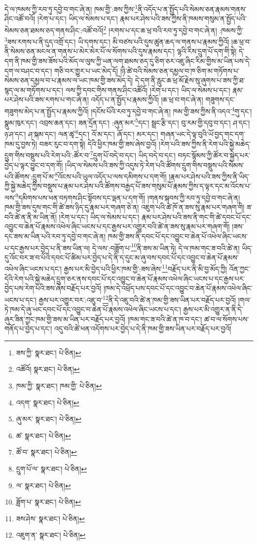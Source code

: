 དེ་ལ་ཁམས་ཀྱི་རབ་ཏུ་དབྱེ་བ་གང་ཞེ་ན། ཁམ་གྱི་:ཟས་ཀྱིས་\footnote{ཟས་ཀྱི་  སྣར་ཐང་།  པེ་ཅིན། }ནི་འདོད་པ་ན་སྤྱོད་པའི་སེམས་ཅན་རྣམས་གནས་ཤིང་འཚོ་བའོ། །རེག་པ་དང་། ཡིད་ལ་སེམས་པ་དང་། རྣམ་པར་ཤེས་པའི་ཟས་ཀྱིས་ནི་ཁམས་གསུམ་ན་སྤྱོད་པའི་སེམས་ཅན་ཐམས་ཅད་གནས་ཤིང་:འཚོ་བའོ།\footnote{འཚོའོ།  སྣར་ཐང་།  པེ་ཅིན། } །རགས་པ་དང་ཆ་ཕྲ་བའི་རབ་ཏུ་དབྱེ་བ་གང་ཞེ་ན། :ཁམས་ཀྱི་\footnote{ཁམ་ཀྱི་  སྣར་ཐང་། ཁམ་གྱི་  པེ་ཅིན། }ཟས་རགས་པ་ནི་དུད་འགྲོ་དང་། ཡི་དགས་དང་། མི་བཙས་པའི་དུས་ཚུན་ཆད་ལ་གནས་པ་རྣམས་ཀྱིའོ། །ཆ་ཕྲ་བ་ནི་སེམས་ཅན་མངལ་ན་གནས་པ་མེར་མེར་པོ་ལ་སོགས་པའི་དུས་རྣམས་དང་། ལྷའི་རིས་དྲུག་པོ་དག་གི་སྟེ། དེ་དག་ནི་ཁམ་གྱི་ཟས་ཟོས་པའི་མོད་ལ་ལུས་ཀྱི་ཡན་ལག་ཐམས་ཅད་དུ་ཅིག་ཅར་འཇུ་ཞིང་རིམ་གྱིས་མ་ཡིན་པས་དེ་དག་ལ་བཤང་བ་དང་། གཅི་བར་གྱུར་པ་ཡང་མེད་དོ། །ཉི་ཚེ་བའི་སེམས་ཅན་དམྱལ་བ་ཁ་ཅིག་མ་གཏོགས་པ་སེམས་ཅན་དམྱལ་བ་པ་རྣམས་ལ་ཡང་ཁམ་གྱི་ཟས་མེད་དེ། དེ་དག་ནི་རླུང་ཆ་ཕྲ་མོ་རྗེས་སུ་ཞུགས་པ་ཟས་ཀྱི་ཐ་སྙད་ལ་མ་གཏོགས་པ་དང་། ལས་ཀྱི་དབང་གིས་གནས་ཤིང་འཚོའོ། །རེག་པ་དང་། ཡིད་ལ་སེམས་པ་དང་། རྣམ་པར་ཤེས་པའི་ཟས་རགས་པ་གང་ཞེ་ན། འདོད་པ་ན་སྤྱོད་པ་རྣམས་ཀྱིའོ། །ཆ་ཕྲ་བ་གང་ཞེ་ན། གཟུགས་དང་གཟུགས་མེད་པ་ན་སྤྱོད་པ་རྣམས་ཀྱིའོ། །དངོས་པོའི་རབ་ཏུ་དབྱེ་བ་གང་ཞེ་ན། ཁམ་གྱི་ཟས་ཀྱིས་ནི་འདའ་\footnote{འདག་  སྣར་ཐང་།  པེ་ཅིན། }གུ་དང་། སྣུམ་ཁུར་དང་། འབྲས་ཆན་དང་། ཟན་དྲོན་དང་། :ཞུན་མར་\footnote{ཞུ་མར་  སྣར་ཐང་།  པེ་ཅིན། }དང་། སྦྲང་རྩི་དང་། བུ་རམ་གྱི་དབུ་བ་དང་། ཤ་དང་། ཉ་ཤ་དང་། ཤ་སྐམ་དང་། ལན་ཚྭ་\footnote{ཚ་  སྣར་ཐང་།  པེ་ཅིན། }དང་། འོ་མ་དང་། ཞོ་དང་། མར་དང་། གཞན་ཡང་དེ་ལྟ་བུའི་ཡོ་བྱད་གང་དག་ཁམ་དུ་བྱས་ཏེ། བཟར་རུང་བ་དག་སྟེ། དེའི་ཕྱིར་ཁམ་གྱི་ཟས་ཞེས་བྱའོ། །རེག་པའི་ཟས་ཀྱིས་ནི་རེག་པའི་སྐྱེ་མཆེད་དྲུག་གིས་བསྡུས་པའི་རེག་པའི་:ཚོར་བ་\footnote{ཚོ་བ་  སྣར་ཐང་།  པེ་ཅིན། }དྲུག་པོ་བདེ་བ་དང་། ཡིད་བདེ་བ་དང་། བཏང་སྙོམས་ཀྱི་ཚོར་བ་སྐྱེད་པར་བྱེད་པ་ལྟར་བྱུང་བ་དག་གོ། །ཡིད་ལ་སེམས་པའི་ཟས་ཀྱི་འདུས་ཏེ་རེག་པའི་ཚོགས་དྲུག་གིས་བསྡུས་པའི་སེམས་པའི་ཚོགས་:དྲུག་པོ་མ་\footnote{དྲུག་པོ་ལ་  སྣར་ཐང་།  པེ་ཅིན། }འོངས་པའི་ཡུལ་འདོད་པ་ལས་དམིགས་པ་དག་གོ། །རྣམ་པར་ཤེས་པའི་ཟས་ཀྱིས་ནི་ཡིད་ཀྱི་སྐྱེ་མཆེད་ཀྱིས་བསྡུས་པ་རྣམ་པར་ཤེས་པའི་ཚོགས་བརྒྱད་པོ་ཟས་གསུམ་པོ་རྣམས་ཀྱིས་ད་ལྟར་དང་མ་འོངས་པ་ལས་\footnote{ལ་  སྣར་ཐང་།  པེ་ཅིན། }དམིགས་པས་ཕན་བཏགས་ཤིང་སྟོབས་དང་ལྡན་པ་དག་གོ། །གནས་སྐབས་ཀྱི་རབ་ཏུ་དབྱེ་བ་གང་ཞེ་ན། ཁམ་གྱི་ཟས་དུས་གང་གི་ཚེ་ཟས་ཉིད་དུ་རྣམ་པར་གཞག་ཅེ་ན། འཇུག་པའི་ཚེ་ཁོ་ན་ཟས་སུ་རྣམ་པར་གཞག་གི། ཟ་བའི་ཚེ་ན་ནི་མ་ཡིན་ནོ། །རེག་པ་དང་། ཡིད་ལ་སེམས་པ་དང་། རྣམ་པར་ཤེས་པའི་ཟས་ནི་གང་གི་ཚེ་དབང་པོ་དང་འབྱུང་བ་ཆེན་པོ་རྣམས་འཕེལ་ཞིང་ཡངས་པ་དང་རྒྱས་པར་འགྱུར་བའི་ཚེ་ན་ཟས་སུ་རྣམ་པར་གཞག་གོ། །ཟས་དང་ཟས་མ་ཡིན་པའི་རབ་ཏུ་དབྱེ་བ་གང་ཞེ་ན། ཁམ་གྱི་ཟས་ནི་དབང་པོ་དང་འབྱུང་བ་ཆེན་པོ་འཕེལ་ཞིང་ཡངས་པ་དང་རྒྱས་པར་བྱེད་པ་ནི་ཟས་ཡིན་ལ། དེ་ལས་:བཟློག་པ་\footnote{ཟློག་པ་  སྣར་ཐང་།  པེ་ཅིན། }ནི་ཟས་མ་ཡིན་ཏེ། དེ་ལ་ཁམ་གང་ཟ་བའི་ཚེ་ན། ཡིད་དུ་འོང་བར་ཟ་བ་པོའི་དབང་པོ་ཚིམ་པར་བྱེད་པ་དེ་ནི་ད་དུང་མ་ཞུ་བས་དབང་པོ་དང་འབྱུང་བ་ཆེན་པོ་རྣམས་འཕེལ་ཞིང་ཡངས་པ་དང་། རྒྱས་པར་མི་བྱེད་པའི་ཕྱིར་ཁམ་གྱི་:ཟས་ཞེས་\footnote{ཟས་ཤེས་  སྣར་ཐང་།  པེ་ཅིན། }བརྗོད་པར་ནི་མི་བྱ་མོད་ཀྱི། འོན་ཀྱང་དེའི་རེག་པའི་སྐྱེ་མཆེད་དྲུག་ཅར་ནས་དབང་པོ་དང་འབྱུང་བ་ཆེན་པོ་རྣམས་འཕེལ་ཞིང་ཡངས་པ་དང་རྒྱས་པར་བྱེད་པས་རེག་པའི་ཟས་ཞེས་བརྗོད་པར་བྱའོ། །ཁམ་དེ་འཕྲོད་པས་དབང་པོ་དང་འབྱུང་བ་ཆེན་པོ་རྣམས་འཕེལ་ཞིང་ཡངས་པ་དང་། རྒྱས་པར་འགྱུར་བར་:འཇུ་བ་\footnote{འཇུག་ན་  སྣར་ཐང་།  པེ་ཅིན། }ནི་དེ་འཇུ་བའི་ཚེ་ན་ཁམ་གྱི་ཟས་ཡིན་པར་བརྗོད་པར་བྱའོ། །གལ་ཏེ་ཁམ་དེ་ཞུ་ཡང་དབང་པོ་དང་འབྱུང་བ་ཆེན་པོ་རྣམས་འཕེལ་ཞིང་ཡངས་པ་དང་། རྒྱས་པར་མི་འགྱུར་ན་ནི་དེ་ཞུར་ཟིན་ཀྱང་ཁམ་གྱི་ཟས་མ་ཡིན་པར་བརྗོད་པར་བྱའོ། །ཁམ་གང་ཟ་བའི་ཚེ་ན་ཁ་བ་དང་། ཚ་བ་ལ་སོགས་པས་གནོད་པ་བྱེད་པ་དང་། འདུ་བའི་ཚེ་ཕན་འདོགས་པར་བྱེད་པ་དེ་ནི་ཁམ་གྱི་ཟས་ཡིན་པར་བརྗོད་པར་བྱའོ། 